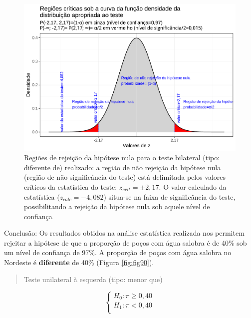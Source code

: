 \documentclass[
]{book}
\begin{document}
\begin{figure}

{\centering \includegraphics[width=1\linewidth]{apostila_files/figure-latex/fig92-1} 

}

\caption{Regiões de rejeição da hipótese nula para o teste bilateral (tipo: diferente de) realizado: a região de não rejeição da hipótese nula (região de não significância do teste) está delimitada pelos valores críticos da estatística do teste: $z_{crit} =\pm 2,17$. O valor calculado da estatística ($z_{calc}=-4,082$) situa-se na faixa de significância do teste, possibilitando a rejeição da hipótese nula sob aquele nível de confiança}\label{fig:fig92}
\end{figure}

\hfill\break

Conclusão: Os resultados obtidos na análise estatística realizada nos permitem rejeitar a hipótese de que a proporção de poços com água salobra é de 40\% sob um nível de confiança de 97\%. A proporção de poços com água salobra no Nordeste é \textbf{diferente} de 40\% (Figura \ref{fig:fig90}).

\hfill\break

\begin{quote}
Teste unilateral à esquerda (tipo: menor que)
\end{quote}

\hfill\break

\[
\begin{cases}
    H_{0}: \pi \ge 0,40\\
    H_{1}: \pi < 0,40\\
\end{cases}
\]
\end{document}
